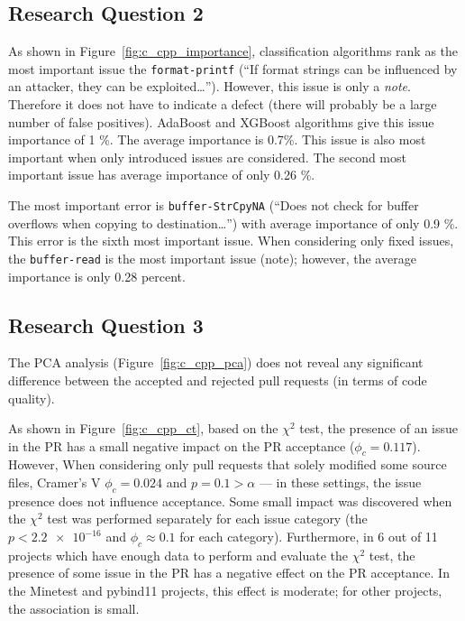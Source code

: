 \documentclass[digital,oneside,oldtable,nolof,nolot,nocover]{fithesis4}
\begin{document}
\subsection{Research Question 2}
\label{sec:orgccb6ff1}
As shown in Figure~\ref{fig:c_cpp_importance},
classification algorithms rank as the most important issue the
\texttt{format-printf} (``If format strings can be influenced by an attacker, they
can be exploited\dots{}''). However, this issue is only a \emph{note}.  Therefore it
does not have to indicate a defect (there will probably be a large number of
false positives). AdaBoost and XGBoost algorithms give this issue importance
of 1 \%. The average importance is 0.7\%.  This issue is also most important
when only introduced issues are considered. The second most important issue has
average importance of only 0.26 \%.

The most important error is \texttt{buffer-StrCpyNA} (``Does not check for buffer
overflows when copying to destination\dots{}'') with average importance of only
0.9 \%. This error is the sixth most important issue.
When considering only fixed issues, the \texttt{buffer-read} is the most important issue (note);
however, the average importance is only 0.28 percent.
\subsection{Research Question 3}
\label{sec:org06d9bf4}
The PCA analysis (Figure~\ref{fig:c_cpp_pca})
does not reveal any significant difference between the accepted
and rejected pull requests (in terms of code quality).

As shown in Figure~\ref{fig:c_cpp_ct}, based on the \(\chi^2\) test,
the presence of an issue in the PR has a small negative impact
on the PR acceptance (\(\phi_c = 0.117\)).
However, When considering only pull requests that solely modified some source files,
Cramer's V \(\phi_c = 0.024\) and \(p = 0.1 > \alpha\) --- in these settings, the issue presence
does not influence acceptance.
Some small impact was discovered when the \(\chi^2\) test was performed separately for
each issue category (the \(p < \num{2.2e-16}\) and \(\phi_c \approx 0.1\) for each category).
Furthermore, in 6 out of 11 projects which have enough data to perform and evaluate the \(\chi^2\) test,
the presence of some issue in the PR has a negative effect on the PR acceptance.
In the Minetest and pybind11 projects, this effect is moderate;
for other projects, the association is small.
\end{document}
